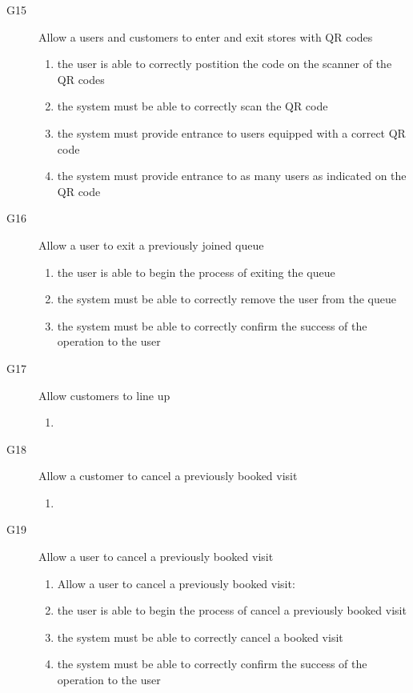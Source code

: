 \begin{description}
\begin{enumerate}[resume*]
        \end{enumerate}
    \item [G15] Allow a users and customers to enter and exit stores with QR codes
        \begin{enumerate}[resume*]
            \item the user is able to correctly postition the code on the scanner of the QR codes
            \item the system must be able to correctly scan the QR code
            \item the system must  provide entrance to users equipped with a correct QR code 
            \item the system must provide entrance to as many users as indicated on the QR code
        \end{enumerate}
    \item [G16] Allow a user to exit a previously joined queue
        \begin{enumerate}[resume*]
            \item the user is able to begin the process of exiting the queue
            \item the system must be able to correctly remove the user from the queue
            \item the system must be able to correctly confirm the success of the operation to the user
        \end{enumerate}
    \item [G17] Allow customers to line up
        \begin{enumerate}[resume*]
            \item 
        \end{enumerate}
    \item [G18] Allow a customer to cancel a previously booked visit
        \begin{enumerate}[resume*]
            \item 
        \end{enumerate}
    \item [G19] Allow a user to cancel a previously booked visit
        \begin{enumerate}[resume*]
            \item Allow a user to cancel a previously booked visit:
            \item the user is able to begin the process of cancel a previously booked visit
            \item the system must be able to correctly cancel a booked visit
            \item the system must be able to correctly confirm the success of the operation to the user
        \end{enumerate}
\end{description}

